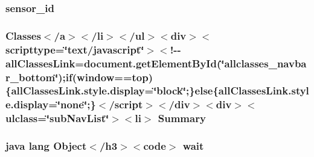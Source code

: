 \hypertarget{_sensor_alerts_8html_a48a4081a48bf69abc4ba5d704ec33919}{
\subsubsection[{sensor\-\_\-id}]{\setlength{\rightskip}{0pt plus 5cm}sensor\-\_\-id}}\label{_sensor_alerts_8html_a48a4081a48bf69abc4ba5d704ec33919}
\hypertarget{_sensor_alerts_8html_a6f9ab45abc9b0679dc1b132fbacfc681}{
\subsubsection[{Summary}]{\setlength{\rightskip}{0pt plus 5cm}Classes$<$/{\bf a}$>$$<$/li$>$$<$/ul$>$$<$div$>$$<$scripttype=\char`\"{}text/javascript\char`\"{}$>$$<$!-\/-\/all\-Classes\-Link=document.\-get\-Element\-By\-Id(\char`\"{}allclasses\-\_\-navbar\-\_\-bottom\char`\"{});if(window==top)\{all\-Classes\-Link.\-style.\-display=\char`\"{}block\char`\"{};\}else\{all\-Classes\-Link.\-style.\-display=\char`\"{}none\char`\"{};\}$<$/script$>$$<$/div$>$$<$div$>$$<$ulclass=\char`\"{}sub\-Nav\-List\char`\"{}$>$$<$li$>$ Summary}}\label{_sensor_alerts_8html_a6f9ab45abc9b0679dc1b132fbacfc681}
\hypertarget{_sensor_alerts_8html_a9a9f0c22e5688d478c707f910f1c1aea}{
\subsubsection[{wait}]{\setlength{\rightskip}{0pt plus 5cm}java lang Object$<$/h3$>$$<$code$>$ wait}}\label{_sensor_alerts_8html_a9a9f0c22e5688d478c707f910f1c1aea}
